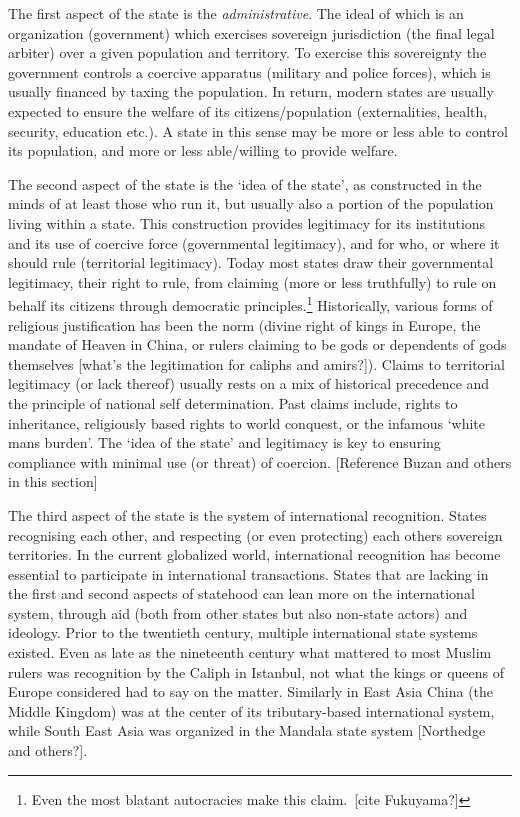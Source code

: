 The first aspect of the state is the \textit{administrative}. The ideal of
which is an organization (government) which exercises sovereign jurisdiction
(the final legal arbiter) over a given population and territory. To exercise
this sovereignty the government controls a coercive apparatus (military and
police forces), which is usually financed by taxing the population. In return,
modern states are usually expected to ensure the welfare of its
citizens/population (externalities, health, security, education etc.). A state
in this sense may be more or less able to control its population, and more or
less able/willing to provide welfare.

The second aspect of the state is the `idea of the state', as constructed in
the minds of at least those who run it, but usually also a portion of the
population living within a state. This construction provides legitimacy for its
institutions and its use of coercive force (governmental legitimacy), and for
who, or where it should rule (territorial legitimacy). Today most states draw
their governmental legitimacy, their right to rule, from claiming (more or less
truthfully) to rule on behalf its citizens through democratic
principles.\footnote{Even the most blatant autocracies make this claim. [cite
Fukuyama?]} Historically, various forms of religious justification has been the
norm (divine right of kings in Europe, the mandate of Heaven in China, or rulers
claiming to be gods or dependents of gods themselves [what's the legitimation
for caliphs and amirs?]). Claims to territorial legitimacy (or lack thereof)
usually rests on a mix of historical precedence and the principle of national
self determination. Past claims include, rights to inheritance, religiously
based rights to world conquest, or the infamous `white mans burden'. The
`idea of the state' and legitimacy is key to ensuring compliance with minimal
use (or threat) of coercion. [Reference Buzan and others in this section]

The third aspect of the state is the system of international recognition. States
recognising each other, and respecting (or even protecting) each others
sovereign territories. In the current globalized world, international
recognition has become essential to participate in international transactions.
States that are lacking in the first and second aspects of statehood can lean
more on the international system, through aid (both from other states but also
non-state actors) and ideology. Prior to the twentieth century, multiple
international state systems existed. Even as late as the nineteenth century what
mattered to most Muslim rulers was recognition by the Caliph in Istanbul, not
what the kings or queens of Europe considered had to say on the matter.
Similarly in East Asia China (the Middle Kingdom) was at the center of its
tributary-based international system, while South East Asia was organized in the
Mandala state system [Northedge and others?].

